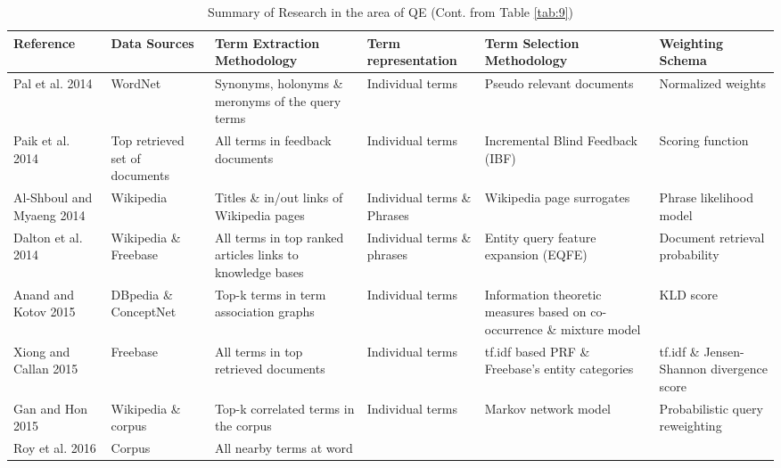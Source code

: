 \begin{landscape}
	\begin{table}
		\centering
		
		\caption{Summary of Research in the area of QE (Cont. from Table \ref{tab:9}) \label{tab:10}}{
			
			\begin{tabular}{ | M{3cm} | M{3cm} | M{3.2cm} | M{3cm} | M{3cm} | M{3cm} |}
				\hline 
				
				\textbf{Reference} & \textbf{Data Sources} & \textbf{Term Extraction Methodology} & \textbf{Term representation} & \textbf{Term Selection Methodology} & \textbf{Weighting Schema} \\ \hline 
		        Pal et al. 2014	\cite{pal2014improving} & WordNet & Synonyms, holonyms \& meronyms of the query terms & Individual terms & Pseudo relevant documents & Normalized weights  \\ \hline
				Paik et al. 2014 \cite{paik2014incremental} & Top retrieved set of documents & All terms in feedback documents & Individual terms & Incremental Blind Feedback (IBF) & Scoring function  \\ \hline
				Al-Shboul and Myaeng 2014 \cite{al2014wikipedia} & Wikipedia & Titles \& in/out links of Wikipedia pages  & Individual terms \& Phrases & Wikipedia page surrogates & Phrase likelihood model\\ \hline
				Dalton et al. 2014 \cite{dalton2014entity} & Wikipedia \& Freebase & All terms in  top ranked articles links to knowledge bases  & Individual terms \& phrases  & Entity query feature expansion (EQFE) & Document retrieval probability \\ \hline
			    Anand and Kotov 2015 \cite{anand2015empirical} & DBpedia \& ConceptNet  & Top-k terms in term association graphs  & Individual terms & Information theoretic measures
				based on co-occurrence \& mixture model  & KLD score \\ \hline
				Xiong and Callan 2015 \cite{xiong2015query} & Freebase & All terms in top retrieved documents  & Individual terms  & tf.idf based PRF \& Freebase's entity
				categories & tf.idf \& Jensen-Shannon divergence score \\ \hline
				Gan and Hon	2015 \cite{gan2015improving} & Wikipedia \& corpus  & Top-k correlated terms in the corpus  & Individual terms &  Markov network model &  Probabilistic query reweighting \\ \hline
				Roy et al. 2016 \cite{roy2016using} & Corpus  & All nearby terms at word

\end{tabular}}
\end{table}
\end{landscape}
